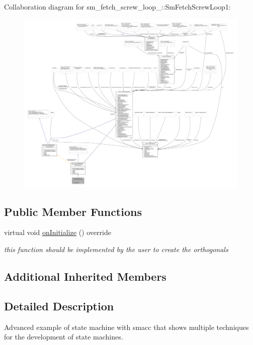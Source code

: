 Collaboration diagram for sm\+\_\+fetch\+\_\+screw\+\_\+loop\+\_\+:\+:Sm\+Fetch\+Screw\+Loop1\+:
\nopagebreak
\begin{figure}[H]
\begin{center}
\leavevmode
\includegraphics[width=350pt]{structsm__fetch__screw__loop__1_1_1SmFetchScrewLoop1__coll__graph}
\end{center}
\end{figure}
\subsection*{Public Member Functions}
\begin{DoxyCompactItemize}
\item 
virtual void \hyperlink{structsm__fetch__screw__loop__1_1_1SmFetchScrewLoop1_a0a939505f6e1dbeb48a5284433437dab}{on\+Initialize} () override
\begin{DoxyCompactList}\small\item\em this function should be implemented by the user to create the orthogonals \end{DoxyCompactList}\end{DoxyCompactItemize}
\subsection*{Additional Inherited Members}


\subsection{Detailed Description}
Advanced example of state machine with smacc that shows multiple techniques for the development of state machines. 


